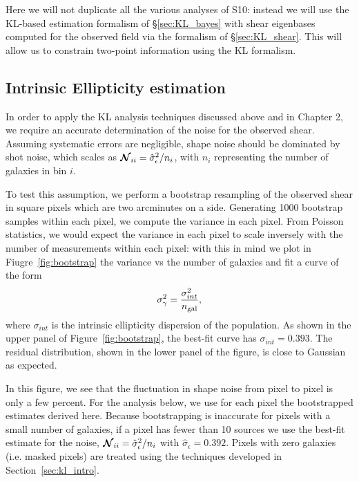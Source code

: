 Here we will not duplicate all the various analyses of S10: instead we
will use the KL-based estimation formalism of \S\ref{sec:KL_bayes} with
shear eigenbases computed for the observed field via the formalism
of \S\ref{sec:KL_shear}.  This will allow us to constrain two-point
information using the KL formalism.

\subsection{Intrinsic Ellipticity estimation}
\label{sec:bootstrap}
In order to apply the KL analysis techniques discussed
above and in Chapter 2, we require an accurate
determination of the noise for the observed shear.  Assuming systematic
errors are negligible, shape noise should be dominated by shot noise,
which scales as $\boldsymbol{\mathcal{N}}_{ii} = \hat{\sigma}_\epsilon^2 / n_i$,
with $n_i$ representing the number of galaxies in bin $i$.

To test this assumption, we perform a bootstrap resampling of the observed
shear in square pixels which are two arcminutes on a side.
Generating 1000 bootstrap samples within each
pixel, we compute the variance in each pixel.
From Poisson statistics, we would expect the variance in each pixel to
scale inversely with the number of measurements within each pixel: with this
in mind we plot in Fiugre~\ref{fig:bootstrap}
the variance vs the number of galaxies and fit a curve of the form 
\begin{equation}
  \sigma_\gamma^2 = \frac{\sigma_{int}^2}{n_{\rm gal}},
\end{equation}
where $\sigma_{int}$ is the intrinsic ellipticity dispersion of the population.
As shown in the upper panel of Figure~\ref{fig:bootstrap}, the best-fit
curve has $\sigma_{int} = 0.393$.  The residual distribution, shown in the
lower panel of the figure, is close to Gaussian as expected.

In this figure, we see that the fluctuation in shape noise from pixel to
pixel is only a few percent.  For the analysis below, we use for each pixel
the bootstrapped estimates derived here.  Because bootstrapping is inaccurate
for pixels with a small number of galaxies, if a pixel has fewer than 10
sources we use the best-fit estimate for the noise,
$\boldsymbol{\mathcal{N}}_{ii} = \hat{\sigma}_\epsilon^2 / n_i$
with $\hat{\sigma}_\epsilon = 0.392$.  Pixels with zero galaxies (i.e.
masked pixels) are treated using the techniques developed in
Section~\ref{sec:kl_intro}.

